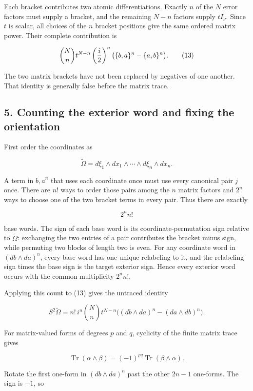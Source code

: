 \documentclass[
  11pt,
]{article}
\begin{document}
Each bracket contributes two atomic differentiations. Exactly \(n\) of
the \(N\) error factors must supply a bracket, and the remaining \(N-n\)
factors supply \(tI_\nu\). Since \(t\) is scalar, all choices of the
\(n\) bracket positions give the same ordered matrix power. Their
complete contribution is

\[
 \binom Nn t^{N-n}\left({i\over2}\right)^n
 \bigl(\{b,a\}^n-\{a,b\}^n\bigr).
 \tag{13}
\]

The two matrix brackets have not been replaced by negatives of one
another. That identity is generally false before the matrix trace.

\subsection{5. Counting the exterior word and fixing the
orientation}\label{counting-the-exterior-word-and-fixing-the-orientation}

First order the coordinates as

\[
 \widetilde\Omega
   =d\xi_1\wedge dx_1\wedge\cdots\wedge
      d\xi_n\wedge dx_n.
\]

A term in \({b,a}^n\) that uses each coordinate once must use every
canonical pair \(j\) once. There are \(n!\) ways to order those pairs
among the \(n\) matrix factors and \(2^n\) ways to choose one of the two
bracket terms in every pair. Thus there are exactly

\[
 2^n n!
 \tag{14}
\]

base words. The sign of each base word is its coordinate-permutation
sign relative to \(\widetilde\Omega\): exchanging the two entries of a
pair contributes the bracket minus sign, while permuting two blocks of
length two is even. For any coordinate word in \((db\wedge da)^n\),
every base word has one unique relabeling to it, and the relabeling sign
times the base sign is the target exterior sign. Hence every exterior
word occurs with the common multiplicity \(2^n n!\).

Applying this count to (13) gives the untraced identity

\[
 S^2\widetilde\Omega
 =n!\,i^n\binom Nn t^{N-n}
  \bigl((db\wedge da)^n-(da\wedge db)^n\bigr).
 \tag{15}
\]

For matrix-valued forms of degrees \(p\) and \(q\), cyclicity of the
finite matrix trace gives

\[
 \operatorname{Tr}(\alpha\wedge\beta)
  =(-1)^{pq}\operatorname{Tr}(\beta\wedge\alpha).
\]

Rotate the first one-form in \((db\wedge da)^n\) past the other \(2n-1\)
one-forms. The sign is \(-1\), so
\end{document}
